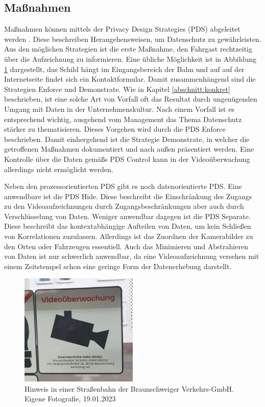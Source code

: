 \subsection{Maßnahmen}
\label{abschnitt:massnahmen}
Maßnahmen können mittels der \glqq{}Privacy Design Strategies\grqq{} (PDS) abgeleitet werden \cite{Hoepman.2022}. Diese beschreiben Herangehensweisen, um Datenschutz zu gewährleisten.
Aus den möglichen Strategien ist die erste Maßnahme, den Fahrgast rechtzeitig über die Aufzeichnung zu informieren. Eine übliche Möglichkeit ist in Abbildung \ref{fig:hinweis} dargestellt, das Schild hängt im Eingangsbereich der Bahn
und auf auf der Internetseite findet sich ein Kontaktformular. Damit zusammenhängend sind die Strategien \glqq{}Enforce\grqq{} und \glqq{}Demonstrate\grqq{}. Wie in Kapitel \ref{abschnitt:konkret} beschrieben,
ist eine solche Art von Vorfall oft das Resultat durch ungenügenden Umgang mit Daten in der Unternehmenskultur. Nach einem Vorfall ist es entsprechend wichtig, ausgehend vom Management das Thema Datenschutz
stärker zu thematisieren. Dieses Vorgehen wird durch die PDS \glqq{}Enforce\grqq{} beschrieben. Damit einhergehend ist die Strategie \glqq{}Demonstrate\grqq{}, in welcher die getroffenen
Maßnahmen dokumentiert und nach außen präsentiert werden. Eine Kontrolle über die Daten gemäßs PDS \glqq{}Control\grqq{} kann in der Videoüberwachung allerdings nicht ermöglicht werden.

Neben den prozessorientierten PDS gibt es noch datenorientierte PDS. Eine anwendbare ist die PDS \glqq{}Hide\grqq{}. Diese beschreibt die Einschränkung des Zugangs zu den Videoaufzeichnungen durch Zugangsbeschränkungen
aber auch durch Verschlüsselung von Daten. Weniger anwendbar dagegen ist die PDS \glqq{}Separate\grqq{}. Diese beschreibt das kontextabhängige Aufteilen von Daten, um kein Schließen von Korrelationen zuzulassen.
Allerdings ist das Zuordnen der Kamerabilder zu den Orten oder Fahrzeugen essentiell. Auch das Minimieren und Abstrahieren von Daten ist nur schwerlich anwendbar, da eine Videoaufzeichnung versehen mit einem Zeitstempel
schon eine geringe Form der Datenerhebung darstellt.
\begin{figure}[ht]
      \begin{center}
            \includegraphics[width= 0.5\textwidth]{Bilder/hinweis.png}
            \caption{Hinweis in einer Straßenbahn der Braunschweiger Verkehrs-GmbH.\\Eigene Fotografie, 19.01.2023}
            \label{fig:hinweis}
      \end{center}
\end{figure}
